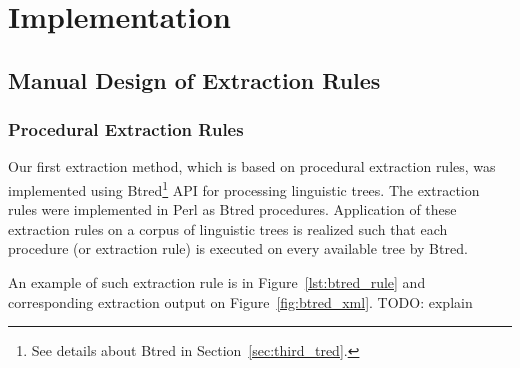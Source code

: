 \chapter{Implementation} \label{sec:ch_implementation}


\section{Manual Design of Extraction Rules} \label{sec:impl_manual_rules}


\subsection{Procedural Extraction Rules} \label{sec:ch50_Procedural_Extraction_Rules} \label{sec:impl_btred_rules}

Our first extraction method, which is based on procedural extraction rules, was implemented using Btred\footnote{See details about Btred in Section~\ref{sec:third_tred}.} API for processing linguistic trees. The extraction rules were implemented in Perl as Btred procedures. Application of these extraction rules on a corpus of linguistic trees is realized such that each procedure (or extraction rule) is executed on every available tree by Btred. 

An example of such extraction rule is in Figure~\ref{lst:btred_rule} and corresponding extraction output on Figure~\ref{fig:btred_xml}. TODO: explain


